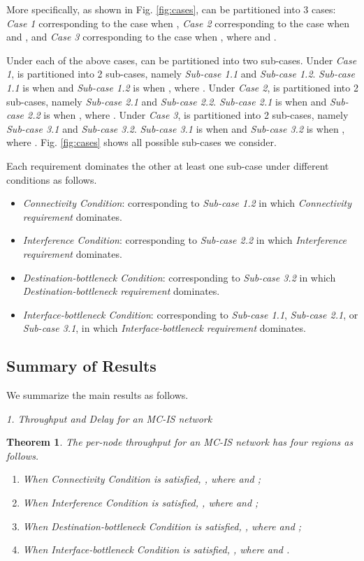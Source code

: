 \documentclass[10pt,journal]{IEEEtran}
\newtheorem{theorem}{Theorem}
\begin{document}
More specifically, as shown in Fig. \ref{fig:cases},  can be partitioned into 3 cases: \emph{Case 1} corresponding to the case when , \emph{Case 2} corresponding to the case when  and , and \emph{Case 3} corresponding to the case when , where  and .

Under each of the above cases,  can be partitioned into two sub-cases. Under \emph{Case 1},  is partitioned into 2 sub-cases, namely \emph{Sub-case 1.1} and \emph{Sub-case 1.2}. \emph{Sub-case 1.1} is when  and \emph{Sub-case 1.2} is when , where . Under \emph{Case 2},  is partitioned into 2 sub-cases, namely \emph{Sub-case 2.1} and \emph{Sub-case 2.2}. \emph{Sub-case 2.1} is when  and \emph{Sub-case 2.2} is when , where . Under \emph{Case 3},  is partitioned into 2 sub-cases, namely \emph{Sub-case 3.1} and \emph{Sub-case 3.2}. \emph{Sub-case 3.1} is when  and \emph{Sub-case 3.2} is when , where . Fig. \ref{fig:cases} shows all possible sub-cases we consider.

Each requirement dominates the other at least one sub-case under different conditions as follows.
\begin{itemize}
\item \textit{Connectivity Condition}: corresponding to \emph{Sub-case 1.2} in which \emph{Connectivity requirement} dominates.
\item \textit{Interference Condition}: corresponding to \emph{Sub-case 2.2} in which \emph{Interference requirement} dominates.
\item \textit{Destination-bottleneck Condition}: corresponding to \emph{Sub-case 3.2} in which \emph{Destination-bottleneck requirement} dominates.
\item \textit{Interface-bottleneck Condition}: corresponding to \emph{Sub-case 1.1}, \emph{Sub-case 2.1}, or \emph{Sub-case 3.1}, in which \emph{Interface-bottleneck requirement} dominates.
\end{itemize}

\subsection{Summary of Results}
\label{subsec:summary}

We summarize the main results as follows.

\emph{1. Throughput and Delay for an MC-IS network}

\begin{theorem}
\label{th:throughput}
The per-node throughput  for an \textit{MC-IS} network has four regions as follows.
\begin{enumerate}
\item [i)] When \textit{Connectivity Condition} is satisfied, , where  and ;
\item [ii)] When \textit{Interference Condition} is satisfied, , where  and ;
\item [iii)] When \textit{Destination-bottleneck Condition} is satisfied, , where  and ;
\item [iv)] When \textit{Interface-bottleneck Condition} is satisfied, , where  and .
\end{enumerate}
\end{theorem}
\end{document}
